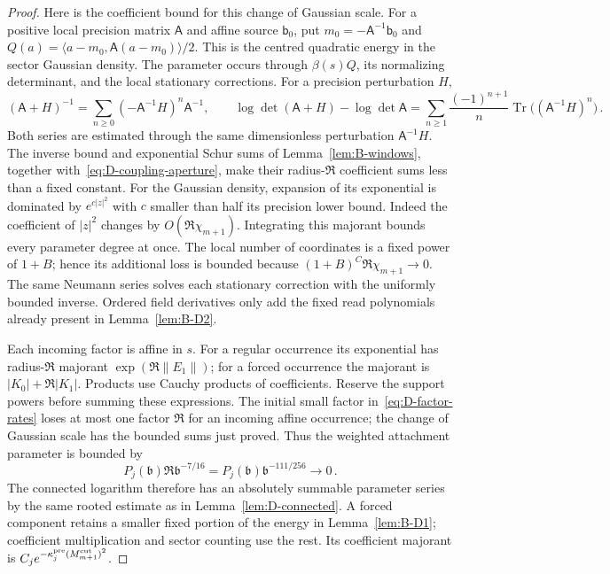 \begin{proof}
Here is the coefficient bound for this change of Gaussian scale. For a positive local precision matrix $\mathsf A$ and affine source $\mathsf b_0$, put $m_0=-\mathsf A^{-1}\mathsf b_0$ and $Q(a)=\langle a-m_0,\mathsf A(a-m_0)\rangle/2$. This is the centred quadratic energy in the sector Gaussian density. The parameter occurs through $\beta(s)Q$, its normalizing determinant, and the local stationary corrections. For a precision perturbation $H$,
\begin{equation*}
(\mathsf A+H)^{-1}=\sum_{n\ge0}(-\mathsf A^{-1}H)^n\mathsf A^{-1},\qquad
\log\det(\mathsf A+H)-\log\det\mathsf A=\sum_{n\ge1}\frac{(-1)^{n+1}}n\operatorname{Tr}\bigl((\mathsf A^{-1}H)^n\bigr)\,.
\end{equation*}
Both series are estimated through the same dimensionless perturbation $\mathsf A^{-1}H$. The inverse bound and exponential Schur sums of Lemma~\ref{lem:B-windows}, together with~\eqref{eq:D-coupling-aperture}, make their radius-$\mathfrak R$ coefficient sums less than a fixed constant. For the Gaussian density, expansion of its exponential is dominated by $e^{c|z|^2}$ with $c$ smaller than half its precision lower bound. Indeed the coefficient of $|z|^2$ changes by $O(\mathfrak R\chi_{m+1})$. Integrating this majorant bounds every parameter degree at once. The local number of coordinates is a fixed power of $1+B$; hence its additional loss is bounded because $(1+B)^C\mathfrak R\chi_{m+1}\to0$. The same Neumann series solves each stationary correction with the uniformly bounded inverse. Ordered field derivatives only add the fixed read polynomials already present in Lemma~\ref{lem:B-D2}.

Each incoming factor is affine in $s$. For a regular occurrence its exponential has radius-$\mathfrak R$ majorant $\exp(\mathfrak R\|E_1\|)$; for a forced occurrence the majorant is $|K_0|+\mathfrak R|K_1|$. Products use Cauchy products of coefficients. Reserve the support powers before summing these expressions. The initial small factor in~\eqref{eq:D-factor-rates} loses at most one factor $\mathfrak R$ for an incoming affine occurrence; the change of Gaussian scale has the bounded sums just proved. Thus the weighted attachment parameter is bounded by
\begin{equation*}
P_j(\mathfrak b)\mathfrak R\mathfrak b^{-7/16}
=P_j(\mathfrak b)\mathfrak b^{-111/256}\longrightarrow0\,.
\end{equation*}
The connected logarithm therefore has an absolutely summable parameter series by the same rooted estimate as in Lemma~\ref{lem:D-connected}. A forced component retains a smaller fixed portion of the energy in Lemma~\ref{lem:B-D1}; coefficient multiplication and sector counting use the rest. Its coefficient majorant is $C_je^{-\kappa_j^{\rm pre}(M^{\mathrm{cut}}_{m+1})^2}$.


\end{proof}
